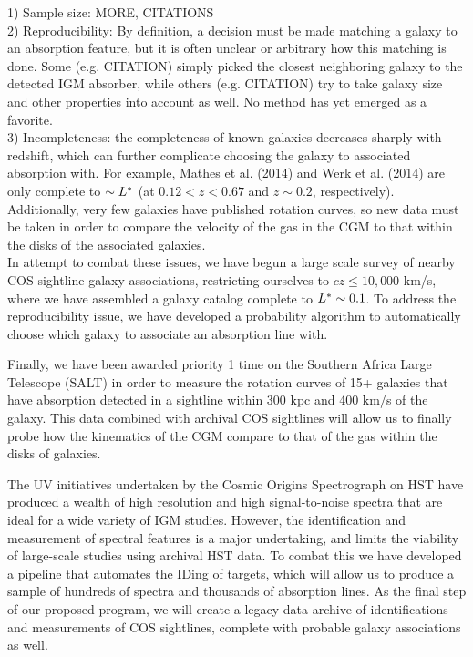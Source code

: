 \documentclass[12pt]{article}
\begin{document}
1) Sample size: MORE, CITATIONS\\

2) Reproducibility: By definition, a decision must be made matching a galaxy to an absorption feature, but it is often unclear or arbitrary how this matching is done. Some (e.g. CITATION) simply picked the closest neighboring galaxy to the detected IGM absorber, while others (e.g. CITATION) try to take galaxy size and other properties into account as well. No method has yet emerged as a favorite.\\

3) Incompleteness: the completeness of known galaxies decreases sharply with redshift, which can further complicate choosing the galaxy to associated absorption with. For example, Mathes et al. (2014) and Werk et al. (2014) are only complete to $\sim L^{\**}$ (at $0.12 < z < 0.67$ and $z\sim0.2$, respectively). Additionally, very few galaxies have published rotation curves, so new data must be taken in order to compare the velocity of the gas in the CGM to that within the disks of the associated galaxies.\\

In attempt to combat these issues, we have begun a large scale survey of nearby COS sightline-galaxy associations, restricting ourselves to $cz \leq 10,000$ km/s, where we have assembled a galaxy catalog complete to $L^{\**}\sim 0.1$. To address the reproducibility issue, we have developed a probability algorithm to automatically choose which galaxy to associate an absorption line with. 

Finally, we have been awarded priority 1 time on the Southern Africa Large Telescope (SALT) in order to measure the rotation curves of 15+ galaxies that have absorption detected in a sightline within 300 kpc and 400 km/s of the galaxy. This data combined with archival COS sightlines will allow us to finally probe how the kinematics of the CGM compare to that of the gas within the disks of galaxies.


The UV initiatives undertaken by the Cosmic Origins Spectrograph on HST have produced a wealth of high resolution and high signal-to-noise spectra that are ideal for a wide variety of IGM studies. However, the identification and measurement of spectral features is a major undertaking, and limits the viability of large-scale studies using archival HST data. To combat this we have developed a pipeline that automates the IDing of targets, which will allow us to produce a sample of hundreds of spectra and thousands of absorption lines. As the final step of our proposed program, we will create a legacy data archive of identifications and measurements of COS sightlines, complete with probable galaxy associations as well.\\
\end{document}
